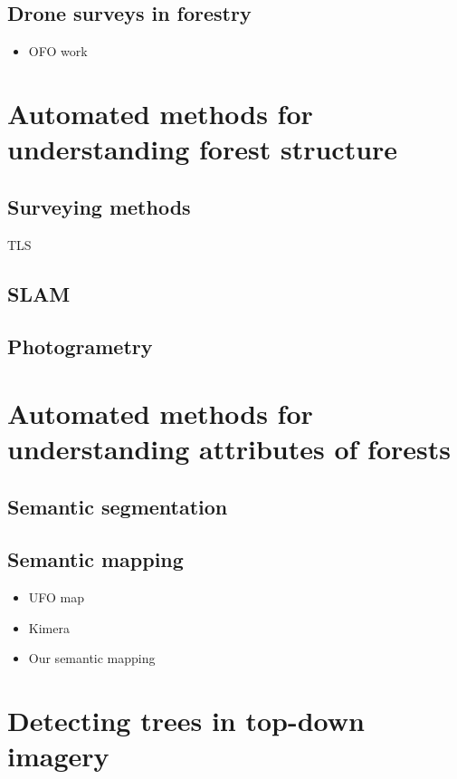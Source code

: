 \subsection{Drone surveys in forestry}
\begin{itemize}
    \item OFO work \cite{Young2022OptimizingForests} 
\end{itemize}

\section{Automated methods for understanding forest structure}
\subsection{Surveying methods}
TLS
\subsection{SLAM}
\subsection{Photogrametry}


\section{Automated methods for understanding attributes of forests}
\subsection{Semantic segmentation}
\subsection{Semantic mapping}

\begin{itemize}
    \item UFO map
    \item Kimera \cite{Rosinol2020}
    \item Our semantic mapping \cite{RussellUnmannedMitigation}
\end{itemize}

\section{Detecting trees in top-down imagery}
\cite{Weinstein2020DeepForest:Delineation}


